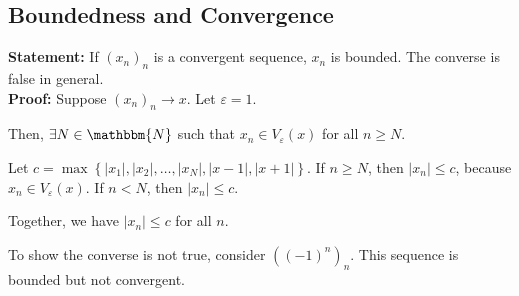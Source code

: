 \documentclass[10pt]{extarticle}
\newcommand{\N}{\mathbbm{N}}
\begin{document}
    \subsection{Boundedness and Convergence}%
    \textbf{Statement:} If $\left(x_n\right)_n$ is a convergent sequence, $x_n$ is bounded. The converse is false in general.\\

    \textbf{Proof:} Suppose $\left(x_n\right)_n \rightarrow x$. Let $\varepsilon = 1$.\newline

    Then, $\exists N\in\N$ such that $x_n\in V_{\varepsilon}(x)$ for all $n\geq N$.\newline

    Let $c = \max\left\{|x_1|,|x_2|,\dots,|x_N|,|x-1|,|x+1|\right\}$. If $n\geq N$, then $|x_n| \leq c$, because $x_n \in V_{\varepsilon}(x)$. If $n < N$, then $|x_n| \leq c$.\newline

    Together, we have $|x_n| \leq c$ for all $n$.\newline

    To show the converse is not true, consider $\left((-1)^n\right)_n$. This sequence is bounded but not convergent.
\end{document}
